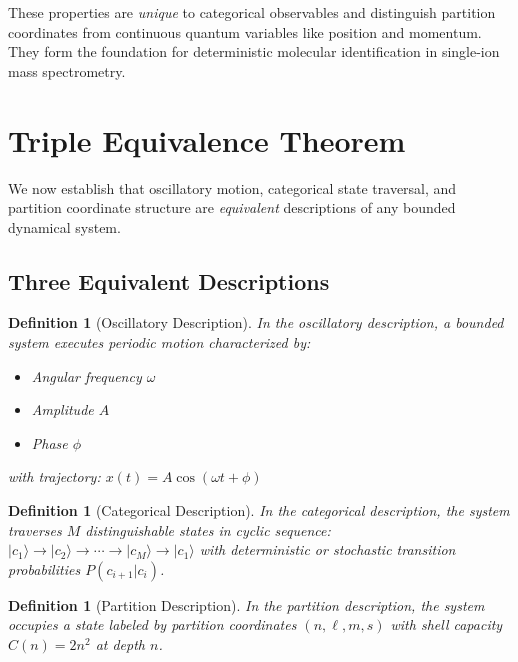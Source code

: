 \documentclass[twocolumn,10pt]{article}
\newtheorem{definition}[theorem]{Definition}
\begin{document}
These properties are \emph{unique} to categorical observables and distinguish partition coordinates from continuous quantum variables like position and momentum. They form the foundation for deterministic molecular identification in single-ion mass spectrometry.



\section{Triple Equivalence Theorem}
\label{sec:triple}

We now establish that oscillatory motion, categorical state traversal, and partition coordinate structure are \emph{equivalent} descriptions of any bounded dynamical system.

\subsection{Three Equivalent Descriptions}

\begin{definition}[Oscillatory Description]
\label{def:oscillatory}
In the \emph{oscillatory description}, a bounded system executes periodic motion characterized by:
\begin{itemize}
    \item Angular frequency $\omega$
    \item Amplitude $A$
    \item Phase $\phi$
\end{itemize}
with trajectory:
$
x(t) = A \cos(\omega t + \phi)
$
\end{definition}

\begin{definition}[Categorical Description]
\label{def:categorical_desc}
In the \emph{categorical description}, the system traverses $M$ distinguishable states in cyclic sequence:
$
|c_1\rangle \to |c_2\rangle \to \cdots \to |c_M\rangle \to |c_1\rangle
$
with deterministic or stochastic transition probabilities $P(c_{i+1}|c_i)$.
\end{definition}

\begin{definition}[Partition Description]
\label{def:partition_desc}
In the \emph{partition description}, the system occupies a state labeled by partition coordinates $(n, \ell, m, s)$ with shell capacity $C(n) = 2n^2$ at depth $n$.
\end{definition}
\end{document}
